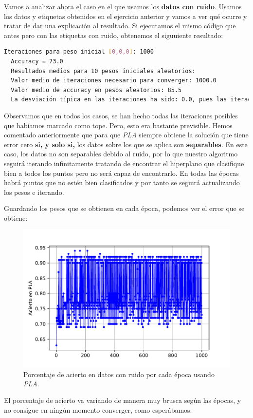 \documentclass[12pt]{article}
\begin{document}
{Vamos a analizar ahora el caso en el que usamos los \textbf{datos con ruido}. Usamos los datos y etiquetas obtenidos en el ejercicio anterior y vamos a ver qué ocurre y tratar de dar una explicación al resultado. Si ejecutamos el mismo código que antes pero con las etiquetas con ruido, obtenemos el siguuiente resultado:

\begin{lstlisting}[language=bash]
  Iteraciones para peso inicial [0,0,0]: 1000
  Accuracy = 73.0
  Resultados medios para 10 pesos iniciales aleatorios:
  Valor medio de iteraciones necesario para converger: 1000.0
  Valor medio de accuracy en pesos aleatorios: 85.5
  La desviación típica en las iteraciones ha sido: 0.0, pues las iteraciones son: [1000, 1000, 1000, 1000, 1000, 1000, 1000, 1000, 1000, 1000]
\end{lstlisting}

Observamos que en todos los casos, se han hecho todas las iteraciones posibles que habíamos marcado como tope. Pero, esto era bastante previsible. Hemos comentado anteriormente que para que \emph{PLA} siempre obtiene la solución que tiene error cero \textbf{si, y solo si,} los datos sobre los que se aplica son \textbf{separables}. En este caso, los datos no son separables debido al ruido, por lo que nuestro algoritmo seguirá iterando infinitamente tratando de encontrar el hiperplano que clasifique bien a todos los puntos pero no será capaz de encontrarlo. En todas las épocas habrá puntos que no estén bien clasificados y por tanto se seguirá actualizando los pesos e iterando. 

Guardando los pesos que se obtienen en cada época, podemos ver el error que se obtiene:

\begin{figure}[H]
  \centering
  \includegraphics[scale = 0.6]{media/PLA-ruido.pdf}
  \caption{Porcentaje de acierto en datos con ruido por cada época usando \emph{PLA}.}
\end{figure}
El porcentaje de acierto va variando de manera muy brusca según las épocas, y no consigue en ningún momento converger, como esperábamos.

}
\end{document}
